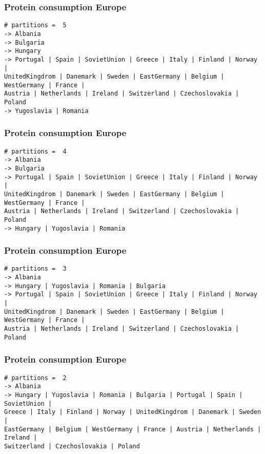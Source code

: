 \begin{frame}[fragile, t]
\frametitle{Protein consumption Europe \hyperlink{last-aliments<1>}{}}
\scriptsize
\begin{verbatim}
# partitions =  5
-> Albania
-> Bulgaria
-> Hungary
-> Portugal | Spain | SovietUnion | Greece | Italy | Finland | Norway | 
UnitedKingdrom | Danemark | Sweden | EastGermany | Belgium | WestGermany | France | 
Austria | Netherlands | Ireland | Switzerland | Czechoslovakia | Poland
-> Yugoslavia | Romania
\end{verbatim}

\end{frame}
\begin{frame}[fragile, t]
\frametitle{Protein consumption Europe \hyperlink{last-aliments<1>}{}}
\scriptsize
\begin{verbatim}
# partitions =  4
-> Albania
-> Bulgaria
-> Portugal | Spain | SovietUnion | Greece | Italy | Finland | Norway | 
UnitedKingdrom | Danemark | Sweden | EastGermany | Belgium | WestGermany | France | 
Austria | Netherlands | Ireland | Switzerland | Czechoslovakia | Poland
-> Hungary | Yugoslavia | Romania
\end{verbatim}

\end{frame}
\begin{frame}[fragile, t]
\frametitle{Protein consumption Europe \hyperlink{last-aliments<1>}{}}
\scriptsize
\begin{verbatim}
# partitions =  3
-> Albania
-> Hungary | Yugoslavia | Romania | Bulgaria
-> Portugal | Spain | SovietUnion | Greece | Italy | Finland | Norway | 
UnitedKingdrom | Danemark | Sweden | EastGermany | Belgium | WestGermany | France | 
Austria | Netherlands | Ireland | Switzerland | Czechoslovakia | Poland
\end{verbatim}

\end{frame}
\begin{frame}[fragile, t]
\frametitle{Protein consumption Europe \hyperlink{last-aliments<1>}{}}
\scriptsize
\begin{verbatim}
# partitions =  2
-> Albania
-> Hungary | Yugoslavia | Romania | Bulgaria | Portugal | Spain | SovietUnion | 
Greece | Italy | Finland | Norway | UnitedKingdrom | Danemark | Sweden | 
EastGermany | Belgium | WestGermany | France | Austria | Netherlands | Ireland | 
Switzerland | Czechoslovakia | Poland
\end{verbatim}

\end{frame}
